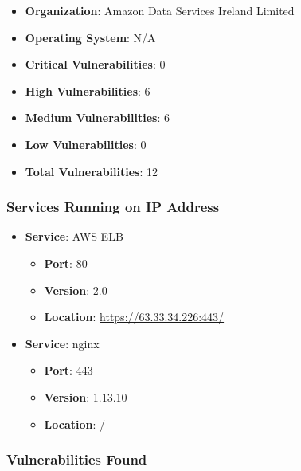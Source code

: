 \documentclass{article}
\begin{document}
\begin{itemize}
    \item \textbf{Organization}: Amazon Data Services Ireland Limited
    \item \textbf{Operating System}:  N/A 
    \item \textbf{Critical Vulnerabilities}: 0
    \item \textbf{High Vulnerabilities}: 6
    \item \textbf{Medium Vulnerabilities}: 6
    \item \textbf{Low Vulnerabilities}: 0
    \item \textbf{Total Vulnerabilities}: 12
\end{itemize}

\subsubsection*{Services Running on IP Address}

\begin{itemize}
    
        \item \textbf{Service}: AWS ELB
        \begin{itemize}
            \item \textbf{Port}: 80
            \item \textbf{Version}:  2.0 
            \item \textbf{Location}: \href{ https://63.33.34.226:443/ }{ https://63.33.34.226:443/ }
        \end{itemize}
    
        \item \textbf{Service}: nginx
        \begin{itemize}
            \item \textbf{Port}: 443
            \item \textbf{Version}:  1.13.10 
            \item \textbf{Location}: \href{ / }{ / }
        \end{itemize}
    
\end{itemize}


\subsubsection*{Vulnerabilities Found}
\end{document}
